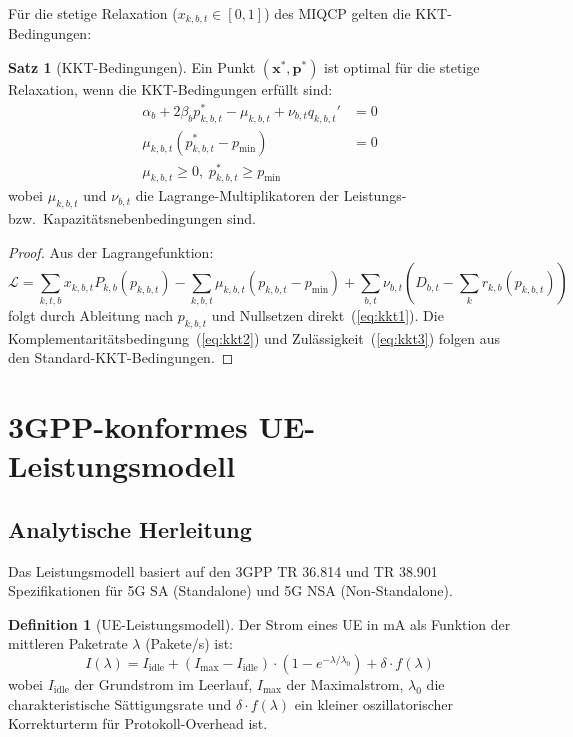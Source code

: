 ﻿\documentclass[a4paper,12pt]{article}
\theoremstyle{definition}
\newtheorem{definition}{Definition}
\newtheorem{satz}{Satz}
\begin{document}
F\"ur die stetige Relaxation ($x_{k,b,t} \in [0,1]$) des MIQCP gelten die
KKT-Bedingungen:

\begin{satz}[KKT-Bedingungen]
  Ein Punkt $(\mathbf{x}^*, \mathbf{p}^*)$ ist optimal f\"ur die stetige
  Relaxation, wenn die KKT-Bedingungen erf\"ullt sind:
  \begin{align}
    \alpha_b + 2\beta_b p^*_{k,b,t} - \mu_{k,b,t} + \nu_{b,t} q_{k,b,t}' &= 0 \label{eq:kkt1}\\
    \mu_{k,b,t} (p^*_{k,b,t} - p_{\min}) &= 0 \label{eq:kkt2}\\
    \mu_{k,b,t} \geq 0,\; p^*_{k,b,t} \geq p_{\min} &\label{eq:kkt3}
  \end{align}
  wobei $\mu_{k,b,t}$ und $\nu_{b,t}$ die Lagrange-Multiplikatoren der Leistungs- bzw.\
  Kapazit\"atsnebenbedingungen sind.
\end{satz}

\begin{proof}
  Aus der Lagrangefunktion:
  \[
    \mathcal{L} = \sum_{k,t,b} x_{k,b,t} P_{k,b}(p_{k,b,t})
    - \sum_{k,b,t} \mu_{k,b,t}(p_{k,b,t} - p_{\min})
    + \sum_{b,t} \nu_{b,t}\!\left(D_{b,t} - \sum_k r_{k,b}(p_{k,b,t})\right)
  \]
  folgt durch Ableitung nach $p_{k,b,t}$ und Nullsetzen direkt~(\ref{eq:kkt1}).
  Die Komplementarit\"atsbedingung~(\ref{eq:kkt2}) und Zul\"assigkeit~(\ref{eq:kkt3})
  folgen aus den Standard-KKT-Bedingungen.
\end{proof}

\section{3GPP-konformes UE-Leistungsmodell}
\label{sec:power}

\subsection{Analytische Herleitung}

Das Leistungsmodell basiert auf den 3GPP TR 36.814 und TR 38.901 Spezifikationen
f\"ur 5G SA (Standalone) und 5G NSA (Non-Standalone).

\begin{definition}[UE-Leistungsmodell]
  Der Strom eines UE in mA als Funktion der mittleren Paketrate $\lambda$ (Pakete/s) ist:
  \[
    I(\lambda) = I_{\mathrm{idle}} + (I_{\max} - I_{\mathrm{idle}}) \cdot
    \left(1 - e^{-\lambda / \lambda_0}\right) + \delta \cdot f(\lambda)
  \]
  wobei $I_{\mathrm{idle}}$ der Grundstrom im Leerlauf, $I_{\max}$ der Maximalstrom,
  $\lambda_0$ die charakteristische Sättigungsrate und $\delta \cdot f(\lambda)$
  ein kleiner oszillatorischer Korrekturterm f\"ur Protokoll-Overhead ist.
\end{definition}
\end{document}
